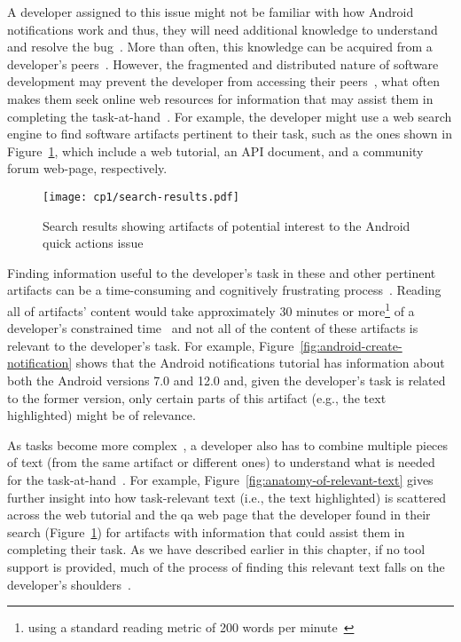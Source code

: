 A developer assigned to this issue might not be familiar with how Android notifications work and thus, they will need additional knowledge to understand and resolve the bug~\cite{ko2007, Li2013, sillito2006}. 
More than often, this knowledge can be acquired from a developer's peers~\cite{singer2011}. 
However, the fragmented and distributed nature of software development  
may prevent the developer from accessing their peers~\cite{ko2007},
what often makes  them seek online web resources for information 
that may assist them in completing the task-at-hand~\cite{Xia2017, rao2020}.
For example, the developer might use a web search engine to find software artifacts
pertinent to their task, such as the ones shown in 
Figure~\ref{fig:android-search-results}, which include a web tutorial, 
an API document, and a community forum web-page, respectively. 




\begin{figure}
    \centering
    \texttt{[image: cp1/search-results.pdf]}
    \caption{Search results showing artifacts of potential interest to the Android quick actions issue}
    \label{fig:android-search-results}
\end{figure}




Finding information useful to the developer's task 
 in these and other 
pertinent artifacts can be a time-consuming
and cognitively frustrating process~\cite{Begel2008,
robillard2011field}. 
Reading all of artifacts' content would take approximately 30 minutes or more\footnote{using a standard reading metric of 200 words per minute~\cite{Just1980}} of a developer's constrained time~\cite{endrikat2014, Meyer2017}
and not all of the content of these artifacts is relevant to the developer's task. 
For example, 
Figure~\ref{fig:android-create-notification} shows
that the Android notifications tutorial 
has information about both the Android versions 7.0 and 12.0 and, given the developer's task 
is related to the former version, only certain parts of this artifact  
(e.g., the text highlighted)
might be of relevance.





As tasks become more complex~\cite{Pirolli2007, Bystrom1995}, a developer also has to combine multiple pieces of text (from the same artifact or different ones) to understand what is needed for the task-at-hand~\cite{Piorkowski2016}. For example, Figure~\ref{fig:anatomy-of-relevant-text} gives further insight into 
how task-relevant text (i.e., the text highlighted)
is scattered across the web tutorial and the \acf{qa}
web page that the developer found in their search (Figure~\ref{fig:android-search-results})
for artifacts with information that could assist them in completing their task.
As we have described earlier in this chapter, if no tool support is provided, much of the process of finding this relevant text falls on the developer's shoulders~\cite{gonccalves2011, Ko2006a, Bystrom1995}.



